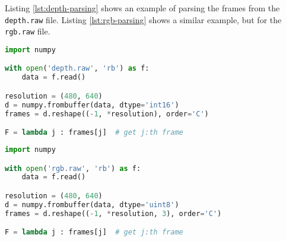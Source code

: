 Listing \ref{lst:depth-parsing} shows an example of parsing the frames from the \texttt{depth.raw} file.
Listing \ref{lst:rgb-parsing} shows a similar example, but for the \texttt{rgb.raw} file.

\begin{lstlisting}[language=Python, caption={Code example for parsing depth frames from file},label={lst:depth-parsing}]
import numpy

with open('depth.raw', 'rb') as f:
    data = f.read()

resolution = (480, 640)
d = numpy.frombuffer(data, dtype='int16')
frames = d.reshape((-1, *resolution), order='C')

F = lambda j : frames[j]  # get j:th frame
\end{lstlisting}

\begin{lstlisting}[language=Python, caption={Code example for parsing rgb frames from file},label={lst:rgb-parsing}]
import numpy

with open('rgb.raw', 'rb') as f:
    data = f.read()

resolution = (480, 640)
d = numpy.frombuffer(data, dtype='uint8')
frames = d.reshape((-1, *resolution, 3), order='C')

F = lambda j : frames[j]  # get j:th frame
\end{lstlisting}